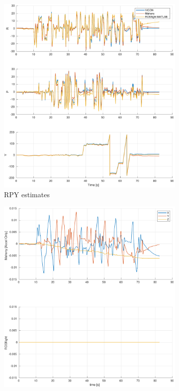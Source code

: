 \documentclass[a4paper]{article}
\begin{document}
\begin{figure}[H]
  \centering
  \begin{subfigure}[t]{0.31\textwidth}
    \includegraphics[width=\textwidth]{estrpy_gyroonly.pdf}
    \caption{RPY estimates}
    \label{fig:scf_meas}
  \end{subfigure}\hfill
  \begin{subfigure}[t]{0.31\textwidth}
    \includegraphics[width=\textwidth]{estbias_gyroonly.pdf}

\end{subfigure}
\end{figure}
\end{document}
